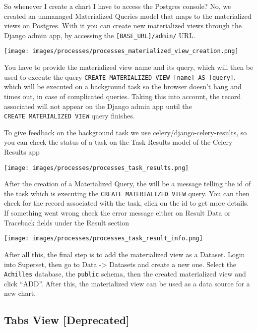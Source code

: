 \documentclass[
]{book}
\begin{document}
So whenever I create a chart I have to access the Postgres console? No, we created an unmanaged Materialized Queries model that maps to the materialized views on Postgres. With it you can create new materialized views through the Django admin app, by accessing the \texttt{{[}BASE\_URL{]}/admin/} URL.

\texttt{[image: images/processes/processes\_materialized\_view\_creation.png]}

You have to provide the materialized view name and its query, which will then be used to execute the query \texttt{CREATE\ MATERIALIZED\ VIEW\ {[}name{]}\ AS\ {[}query{]}}, which will be executed on a background task so the browser doesn't hang and times out, in case of complicated queries. Taking this into account, the record associated will not appear on the Django admin app until the \texttt{CREATE\ MATERIALIZED\ VIEW} query finishes.

To give feedback on the background task we use \href{https://github.com/celery/django-celery-results}{celery/django-celery-results}, so you can check the status of a task on the Task Results model of the Celery Results app

\texttt{[image: images/processes/processes\_task\_results.png]}

After the creation of a Materialized Query, the will be a message telling the id of the task which is executing the \texttt{CREATE\ MATERIALIZED\ VIEW} query. You can then check for the record associated with the task, click on the id to get more details. If something went wrong check the error message either on Result Data or Traceback fields under the Result section

\texttt{[image: images/processes/processes\_task\_result\_info.png]}

After all this, the final step is to add the materialized view as a Dataset. Login into Superset, then go to Data -\textgreater{} Datasets and create a new one. Select the \texttt{Achilles} database, the \texttt{public} schema, then the created materialized view and click ``ADD''. After this, the materialized view can be used as a data source for a new chart.

\hypertarget{tabs-view-deprecated}{%
\subsection*{Tabs View {[}Deprecated{]}}\label{tabs-view-deprecated}}
\end{document}
